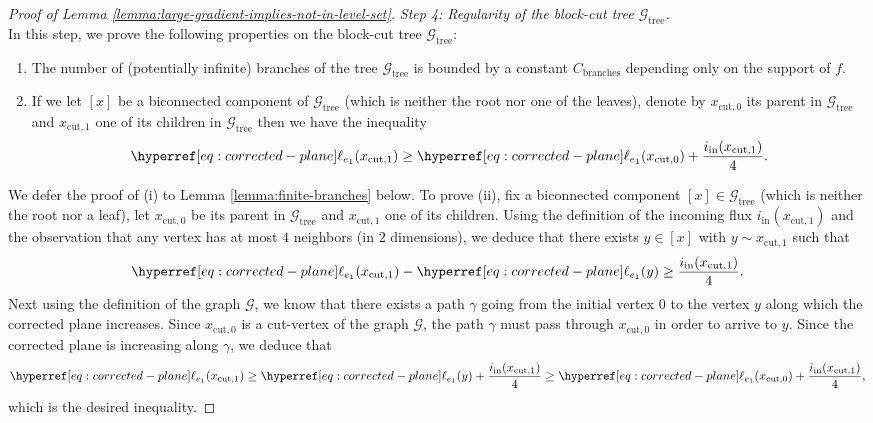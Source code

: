\documentclass[12pt]{amsart}
\numberwithin{equation}{section}
\begin{document}
\begin{proof}[Proof of Lemma \ref{lemma:large-gradient-implies-not-in-level-set}]
		{\it Step 4: Regularity of the block-cut tree $\mathcal{G}_{\mathrm{tree}}$.} \\
		In this step, we prove the following properties on the block-cut tree $\mathcal{G}_{\mathrm{tree}}$:
		\begin{enumerate}
			\item[(i)] The number of (potentially infinite) branches of the tree $\mathcal{G}_{\mathrm{tree}}$ is bounded by a constant $C_{\mathrm{branches}}$ depending only on the support of $f$.
			\item[(ii)] If we let $[x]$ be a biconnected component of $\mathcal{G}_{\mathrm{tree}}$ (which is neither the root nor one of the leaves), denote by $x_{\mathrm{cut} , 0}$ its parent in $\mathcal{G}_{\mathrm{tree}}$ and $x_{\mathrm{cut} , 1}$ one of its children in $\mathcal{G}_{\mathrm{tree}}$ 
			then we have the inequality
			\begin{equation*}
				\ellp{e_1} (x_{\mathrm{cut} , 1}) \geq \ellp{e_1} (x_{\mathrm{cut} , 0}) + \frac{i_{\mathrm{in}}(x_{\mathrm{cut} , 1}) }{4}.
			\end{equation*}
		\end{enumerate}
		We defer the proof of (i) to Lemma \ref{lemma:finite-branches} below. To prove (ii), fix a biconnected component  $[x] \in \mathcal{G}_{\mathrm{tree}}$ (which is neither the root nor a leaf), let $x_{\mathrm{cut} , 0}$ be its parent in $\mathcal{G}_{\mathrm{tree}}$ and $x_{\mathrm{cut} , 1}$ one of its children. Using the definition of the incoming flux $i_{\mathrm{in}}(x_{\mathrm{cut} , 1})$ and the observation that any vertex has at most $4$ neighbors (in $2$ dimensions), we deduce that there exists $y \in [x]$ with $y \sim x_{\mathrm{cut} , 1}$ such that
		\begin{equation*}
			\ellp{e_1}(x_{\mathrm{cut} , 1}) - \ellp{e_1} (y) \geq \frac{i_{\mathrm{in}}(x_{\mathrm{cut} , 1}) }{4}.
		\end{equation*}
		Next using the definition of the graph $\mathcal{G}$, we know that there exists a path $\gamma$ going from the initial vertex $0$ to the vertex $y$ along which the corrected plane increases. Since $x_{\mathrm{cut}, 0}$ is a cut-vertex of the graph $\mathcal{G}$, the path $\gamma$ must pass through $x_{\mathrm{cut}, 0}$ in order to arrive to $y$. Since the corrected plane is increasing along $\gamma$, we deduce that
		\begin{equation} \label{eq:increasevaluefluxcorr}
			\ellp{e_1}(x_{\mathrm{cut} , 1}) \geq \ellp{e_1} (y) + \frac{i_{\mathrm{in}}(x_{\mathrm{cut} , 1}) }{4} \geq \ellp{e_1} (x_{\mathrm{cut}, 0}) + \frac{i_{\mathrm{in}}(x_{\mathrm{cut} , 1}) }{4},
		\end{equation}
		which is the desired inequality.
		

\end{proof}
\end{document}

